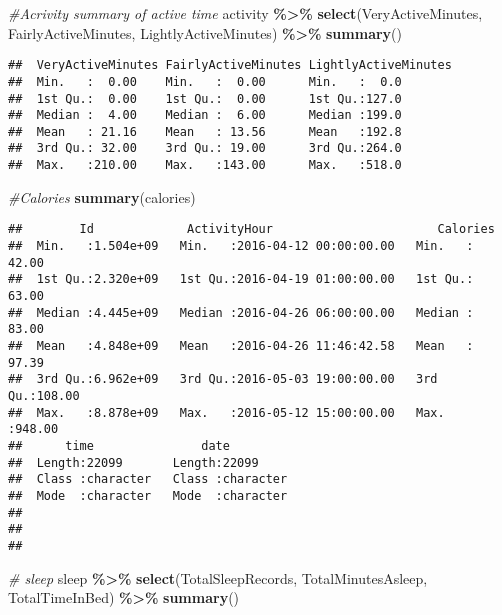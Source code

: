 \documentclass[
]{article}
\newenvironment{Shaded}{\begin{snugshade}}{\end{snugshade}}
\newcommand{\CommentTok}[1]{\textcolor[rgb]{0.56,0.35,0.01}{\textit{#1}}}
\newcommand{\FunctionTok}[1]{\textcolor[rgb]{0.13,0.29,0.53}{\textbf{#1}}}
\newcommand{\NormalTok}[1]{#1}
\newcommand{\SpecialCharTok}[1]{\textcolor[rgb]{0.81,0.36,0.00}{\textbf{#1}}}
\begin{document}
\begin{Shaded}
\begin{Highlighting}[]
\CommentTok{\#Acrivity summary of active time}
\NormalTok{activity }\SpecialCharTok{\%\textgreater{}\%}
  \FunctionTok{select}\NormalTok{(VeryActiveMinutes, FairlyActiveMinutes, LightlyActiveMinutes) }\SpecialCharTok{\%\textgreater{}\%}
  \FunctionTok{summary}\NormalTok{()}
\end{Highlighting}
\end{Shaded}

\begin{verbatim}
##  VeryActiveMinutes FairlyActiveMinutes LightlyActiveMinutes
##  Min.   :  0.00    Min.   :  0.00      Min.   :  0.0       
##  1st Qu.:  0.00    1st Qu.:  0.00      1st Qu.:127.0       
##  Median :  4.00    Median :  6.00      Median :199.0       
##  Mean   : 21.16    Mean   : 13.56      Mean   :192.8       
##  3rd Qu.: 32.00    3rd Qu.: 19.00      3rd Qu.:264.0       
##  Max.   :210.00    Max.   :143.00      Max.   :518.0
\end{verbatim}

\begin{Shaded}
\begin{Highlighting}[]
\CommentTok{\#Calories}
\FunctionTok{summary}\NormalTok{(calories) }
\end{Highlighting}
\end{Shaded}

\begin{verbatim}
##        Id             ActivityHour                       Calories     
##  Min.   :1.504e+09   Min.   :2016-04-12 00:00:00.00   Min.   : 42.00  
##  1st Qu.:2.320e+09   1st Qu.:2016-04-19 01:00:00.00   1st Qu.: 63.00  
##  Median :4.445e+09   Median :2016-04-26 06:00:00.00   Median : 83.00  
##  Mean   :4.848e+09   Mean   :2016-04-26 11:46:42.58   Mean   : 97.39  
##  3rd Qu.:6.962e+09   3rd Qu.:2016-05-03 19:00:00.00   3rd Qu.:108.00  
##  Max.   :8.878e+09   Max.   :2016-05-12 15:00:00.00   Max.   :948.00  
##      time               date          
##  Length:22099       Length:22099      
##  Class :character   Class :character  
##  Mode  :character   Mode  :character  
##                                       
##                                       
## 
\end{verbatim}

\begin{Shaded}
\begin{Highlighting}[]
\CommentTok{\# sleep}
\NormalTok{sleep }\SpecialCharTok{\%\textgreater{}\%}
  \FunctionTok{select}\NormalTok{(TotalSleepRecords, TotalMinutesAsleep, TotalTimeInBed) }\SpecialCharTok{\%\textgreater{}\%}
  \FunctionTok{summary}\NormalTok{()}
\end{Highlighting}
\end{Shaded}
\end{document}
